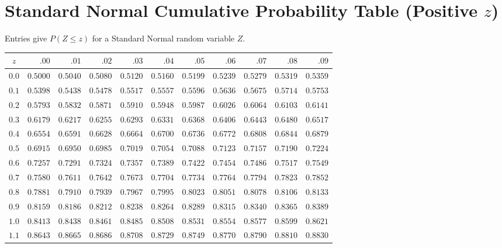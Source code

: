 \documentclass[11pt]{article}
\begin{document}
\clearpage
\section*{Standard Normal Cumulative Probability Table (Positive $z$)}

Entries give $P(Z\leq z)$ for a Standard Normal random variable $Z$.

\vspace{0.2cm}
\small
\setlength{\tabcolsep}{7pt}
\renewcommand{\arraystretch}{1.25}
\begin{tabular}{c*{10}{r}}
\toprule
$z$ & $.00$ & $.01$ & $.02$ & $.03$ & $.04$ & $.05$ & $.06$ & $.07$ & $.08$ & $.09$ \\
\midrule
$0.0$ & $0.5000$ & $0.5040$ & $0.5080$ & $0.5120$ & $0.5160$ & $0.5199$ & $0.5239$ & $0.5279$ & $0.5319$ & $0.5359$ \\
$0.1$ & $0.5398$ & $0.5438$ & $0.5478$ & $0.5517$ & $0.5557$ & $0.5596$ & $0.5636$ & $0.5675$ & $0.5714$ & $0.5753$ \\
$0.2$ & $0.5793$ & $0.5832$ & $0.5871$ & $0.5910$ & $0.5948$ & $0.5987$ & $0.6026$ & $0.6064$ & $0.6103$ & $0.6141$ \\
$0.3$ & $0.6179$ & $0.6217$ & $0.6255$ & $0.6293$ & $0.6331$ & $0.6368$ & $0.6406$ & $0.6443$ & $0.6480$ & $0.6517$ \\
$0.4$ & $0.6554$ & $0.6591$ & $0.6628$ & $0.6664$ & $0.6700$ & $0.6736$ & $0.6772$ & $0.6808$ & $0.6844$ & $0.6879$ \\
$0.5$ & $0.6915$ & $0.6950$ & $0.6985$ & $0.7019$ & $0.7054$ & $0.7088$ & $0.7123$ & $0.7157$ & $0.7190$ & $0.7224$ \\
$0.6$ & $0.7257$ & $0.7291$ & $0.7324$ & $0.7357$ & $0.7389$ & $0.7422$ & $0.7454$ & $0.7486$ & $0.7517$ & $0.7549$ \\
$0.7$ & $0.7580$ & $0.7611$ & $0.7642$ & $0.7673$ & $0.7704$ & $0.7734$ & $0.7764$ & $0.7794$ & $0.7823$ & $0.7852$ \\
$0.8$ & $0.7881$ & $0.7910$ & $0.7939$ & $0.7967$ & $0.7995$ & $0.8023$ & $0.8051$ & $0.8078$ & $0.8106$ & $0.8133$ \\
$0.9$ & $0.8159$ & $0.8186$ & $0.8212$ & $0.8238$ & $0.8264$ & $0.8289$ & $0.8315$ & $0.8340$ & $0.8365$ & $0.8389$ \\
$1.0$ & $0.8413$ & $0.8438$ & $0.8461$ & $0.8485$ & $0.8508$ & $0.8531$ & $0.8554$ & $0.8577$ & $0.8599$ & $0.8621$ \\
$1.1$ & $0.8643$ & $0.8665$ & $0.8686$ & $0.8708$ & $0.8729$ & $0.8749$ & $0.8770$ & $0.8790$ & $0.8810$ & $0.8830$ \\

\end{tabular}
\end{document}
